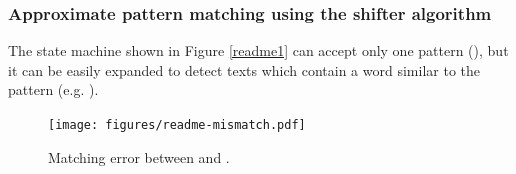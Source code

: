 \documentclass{sigchi}
\begin{document}

\subsubsection{Approximate pattern matching using the shifter algorithm}

The state machine shown in Figure \ref{readme1} can accept only one pattern
(), but
it can be easily expanded to detect texts which contain a word
similar to the pattern (e.g. ).

\begin{figure}[htb]
  \centerline{\texttt{[image: figures/readme-mismatch.pdf]}}
  \caption{Matching error between  and .}
  \label{readme-reddy-mismatch}
\end{figure}
\end{document}
